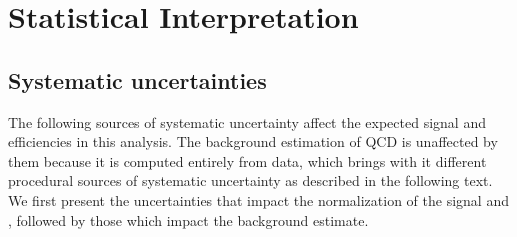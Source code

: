 \chapter{Statistical Interpretation}\label{Sec:Stat}

\section{Systematic uncertainties\label{sec:Systematics}}

The following sources of systematic uncertainty affect the expected signal and \ttbar efficiencies in this analysis. The background estimation of QCD is unaffected by them because it is computed entirely from data, which brings with it different procedural sources of systematic uncertainty as described in the following text. We first present the uncertainties that impact the normalization of the signal and \ttbar, followed by those which impact the background estimate.

